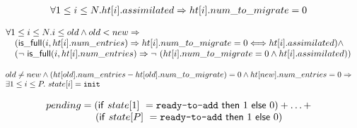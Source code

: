 \begin{lemma}
  \begin{equation*}
\begin{array}{l}        
  \forall 1 \leq i \leq N. \mbox{$ht[i]$}.assimilated \Rightarrow \mbox{$ht[i]$}.num\_to\_migrate = 0
\end{array}
\end{equation*}
  \label{assimilated_nothing_to_migrate}  
\end{lemma}  

\begin{lemma}
  \begin{equation*}
    \begin{array}{l}
    \forall 1 \leq i \leq N. i \leq old \wedge old < new \Rightarrow  \\
    \quad (\mathsf{is\_full}(i, \mbox{$ht[i]$}.num\_entries) \Rightarrow \mbox{$ht[i]$}.num\_to\_migrate = 0 \Longleftrightarrow \mbox{$ht[i]$}.assimilated) \wedge \\
    \quad (\mbox{$\neg\ \mathsf{is\_full}(i, \mbox{$ht[i]$}.num\_entries)$} \Rightarrow \mbox{$\neg\ (\mbox{$ht[i]$}.num\_to\_migrate = 0 \wedge \mbox{$ht[i]$}.assimilated)$})
    \end{array}
  \end{equation*}
  \label{num_to_migrate_and_assimilated_in_old_tables}  
\end{lemma}  

\begin{lemma}
  \begin{equation*}
    \begin{array}{l}
      old \neq new \wedge (\mbox{$ht[old]$}.num\_entries - \mbox{$ht[old]$}.num\_to\_migrate) = 0 \wedge \mbox{$ht[new]$}.num\_entries = 0 \Rightarrow \\
      \exists 1 \leq i \leq P.~state[i] = \mbox{\texttt{init}}
    \end{array}
  \end{equation*}
  \label{one_thread_at_init_state_after_migration}
\end{lemma}


\begin{lemma}
  \begin{equation*}
\begin{array}{l}        
  pending = (\mathsf{if}~state[1]~=\mbox{\texttt{ready-to-add}}~ \mathsf{then}~1~\mathsf{else}~0) + \ldots + \\
   \quad \quad \quad \quad \quad (\mathsf{if}~state[P]~= \mbox{\texttt{ready-to-add}}~ \mathsf{then}~1~\mathsf{else}~0)
\end{array}
\end{equation*}  
  \label{pending}
\end{lemma}  

